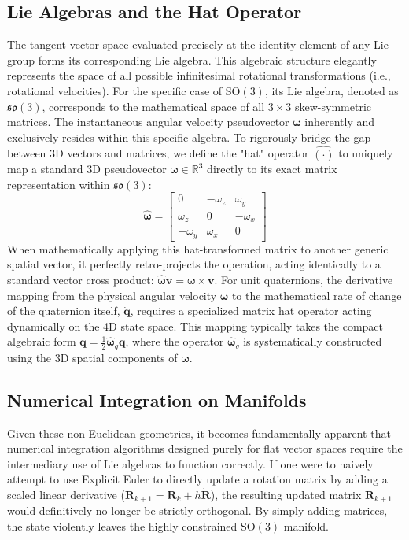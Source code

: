 \subsection{Lie Algebras and the Hat Operator}
The tangent vector space evaluated precisely at the identity element of any Lie group forms its corresponding Lie algebra. This algebraic structure elegantly represents the space of all possible infinitesimal rotational transformations (i.e., rotational velocities). For the specific case of $\text{SO}(3)$, its Lie algebra, denoted as $\mathfrak{so}(3)$, corresponds to the mathematical space of all $3 \times 3$ skew-symmetric matrices. The instantaneous angular velocity pseudovector $\bm{\omega}$ inherently and exclusively resides within this specific algebra.
To rigorously bridge the gap between 3D vectors and matrices, we define the "hat" operator $\widehat{(\cdot)}$ to uniquely map a standard 3D pseudovector $\bm{\omega} \in \mathbb{R}^3$ directly to its exact matrix representation within $\mathfrak{so}(3)$:
\begin{equation}
    \widehat{\bm{\omega}} = \begin{bmatrix} 0 & -\omega_z & \omega_y \\ \omega_z & 0 & -\omega_x \\ -\omega_y & \omega_x & 0 \end{bmatrix}
\end{equation}
When mathematically applying this hat-transformed matrix to another generic spatial vector, it perfectly retro-projects the operation, acting identically to a standard vector cross product: $\widehat{\bm{\omega}} \bm{v} = \bm{\omega} \times \bm{v}$.
For unit quaternions, the derivative mapping from the physical angular velocity $\bm{\omega}$ to the mathematical rate of change of the quaternion itself, $\dot{\bm{q}}$, requires a specialized matrix hat operator acting dynamically on the 4D state space. This mapping typically takes the compact algebraic form $\dot{\bm{q}} = \frac{1}{2} \widehat{\bm{\omega}}_q \bm{q}$, where the operator $\widehat{\bm{\omega}}_q$ is systematically constructed using the 3D spatial components of $\bm{\omega}$.

\subsection{Numerical Integration on Manifolds}
Given these non-Euclidean geometries, it becomes fundamentally apparent that numerical integration algorithms designed purely for flat vector spaces require the intermediary use of Lie algebras to function correctly. If one were to naively attempt to use Explicit Euler to directly update a rotation matrix by adding a scaled linear derivative ($\bm{R}_{k+1} = \bm{R}_k + h \dot{\bm{R}}$), the resulting updated matrix $\bm{R}_{k+1}$ would definitively no longer be strictly orthogonal. By simply adding matrices, the state violently leaves the highly constrained $\text{SO}(3)$ manifold. 

